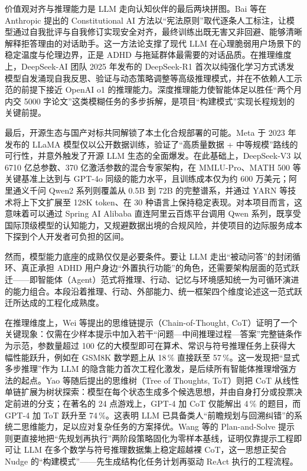 \par 价值观对齐与推理能力是 LLM 走向认知伙伴的最后两块拼图。Bai 等在 Anthropic 提出的 Constitutional AI 方法以``宪法原则''取代逐条人工标注，让模型通过自我批评与自我修订实现安全对齐，最终训练出既无害又非回避、能够清晰解释拒答理由的对话助手\cite{bai2022constitutional}。这一方法论支撑了现代 LLM 在心理脆弱用户场景下的稳定温度与伦理边界，正是 ADHD 与拖延群体最需要的对话品质。在推理维度上，DeepSeek-AI 团队 2025 年发布的 DeepSeek-R1 首次以纯强化学习方式诱发模型自发涌现自我反思、验证与动态策略调整等高级推理模式，并在不依赖人工示范的前提下接近 OpenAI o1 的推理能力\cite{deepseek2025r1}。深度推理能力使智能体足以胜任``两个月内交 5000 字论文''这类模糊任务的多步拆解，是项目``构建模式''实现长程规划的关键前提。

\par 最后，开源生态与国产对标共同解锁了本土化合规部署的可能。Meta 于 2023 年发布的 LLaMA 模型仅以公开数据训练，验证了``高质量数据 + 中等规模''路线的可行性，并意外触发了开源 LLM 生态的全面爆发\cite{touvron2023llama}。在此基础上，DeepSeek-V3 以 6710 亿总参数、370 亿激活参数的混合专家架构，在 MMLU-Pro、MATH 500 等关键基准上达到与 GPT-4o 同级的能力水平，且训练成本仅为约 600 万美元\cite{liu2024deepseek}；阿里通义千问 Qwen2 系列则覆盖从 0.5B 到 72B 的完整谱系，并通过 YARN 等技术将上下文扩展至 128K token、在 30 种语言上保持稳定表现\cite{yang2024qwen2}。对本项目而言，这意味着可以通过 Spring AI Alibaba 直连阿里云百炼平台调用 Qwen 系列，既享受国际顶级模型的认知能力，又规避数据出境的合规风险，并使项目的边际服务成本下探到个人开发者可负担的区间。

\par 然而，模型能力底座的成熟仅仅是必要条件。要让 LLM 走出``被动问答''的封闭循环、真正承担 ADHD 用户身边``外置执行功能''的角色，还需要架构层面的范式跃迁——即智能体（Agent）范式将推理、行动、记忆与环境感知统一为可循环演进的能力组合。本段沿着推理、行动、外部能力、统一框架四个维度论述这一范式跃迁所达成的工程化成熟度。

\par 在推理维度上，Wei 等提出的思维链提示（Chain-of-Thought, CoT）证明了一个关键现象：仅需在少样本提示中加入若干``问题—中间推理过程—答案''完整链条作为示范，参数量超过 100 亿的大模型即可在算术、常识与符号推理任务上获得大幅性能跃升，例如在 GSM8K 数学题上从 18\,\% 直接跃至 57\,\%\cite{wei2022cot}。这一发现把``显式多步推理''作为 LLM 的隐含能力首次工程化激发，是后续所有智能体推理增强方法的起点。Yao 等随后提出的思维树（Tree of Thoughts, ToT）则把 CoT 从线性单链扩展为树状探索：模型在每个状态生成多个候选思想，并由自身打分或投票决定前进的分支；在著名的 24 点游戏上，GPT-4 加 CoT 仅能解出 4\,\% 的题目，而 GPT-4 加 ToT 跃升至 74\,\%\cite{yao2023tot}。这表明 LLM 已具备类人``前瞻规划与回溯纠错''的系统二思维能力，足以应对复杂任务的方案择优。Wang 等的 Plan-and-Solve 提示则更直接地把``先规划再执行''两阶段策略固化为零样本基线，证明仅靠提示工程即可让 LLM 在多个数学与符号推理数据集上稳定超越裸 CoT\cite{wang2023plan}，这一思想正契合 Nudge 的``构建模式''——先生成结构化任务计划再驱动 ReAct 执行的工程流程。

